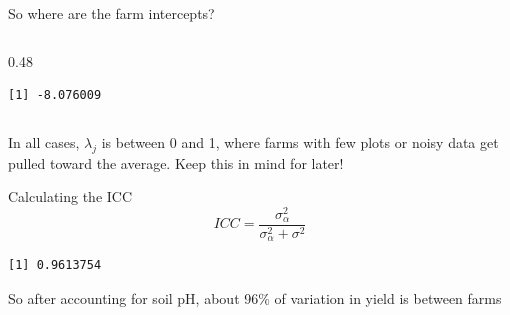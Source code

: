 \documentclass[
  ignorenonframetext,
  aspectratio=169,
]{beamer}
\newenvironment{Shaded}{\begin{snugshade}}{\end{snugshade}}
\newcommand{\DecValTok}[1]{\textcolor[rgb]{0.68,0.00,0.00}{#1}}
\newcommand{\FunctionTok}[1]{\textcolor[rgb]{0.28,0.35,0.67}{#1}}
\newcommand{\NormalTok}[1]{\textcolor[rgb]{0.00,0.23,0.31}{#1}}
\newcommand{\OtherTok}[1]{\textcolor[rgb]{0.00,0.23,0.31}{#1}}
\newcommand{\SpecialCharTok}[1]{\textcolor[rgb]{0.37,0.37,0.37}{#1}}
\newcommand{\StringTok}[1]{\textcolor[rgb]{0.13,0.47,0.30}{#1}}
\begin{document}
\begin{frame}[fragile]{So where are the farm intercepts?}
\begin{columns}[T]
\begin{column}{0.48\textwidth}
\begin{Shaded}
\end{Shaded}

\begin{verbatim}
[1] -8.076009
\end{verbatim}
\end{column}
\end{columns}

\pause

\vspace{2em}

\small
\begin{center}
In all cases, $\lambda_j$ is between 0 and 1, where farms with few plots or noisy data get pulled toward the average. Keep this in mind for later!
\end{center}
\end{frame}

\begin{frame}[fragile]{Calculating the ICC}
\label{calculating-the-icc}
\[ICC = \frac{\sigma^2_\alpha}{\sigma^2_\alpha + \sigma^2}\]

\begin{Shaded}
\end{Shaded}

\begin{verbatim}
[1] 0.9613754
\end{verbatim}

\pause

So after accounting for soil pH, about 96\% of variation in yield is
between farms
\end{frame}
\end{document}

